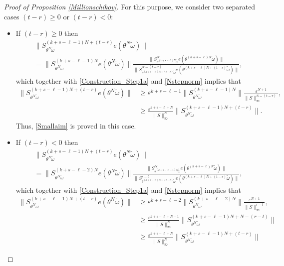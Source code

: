 \documentclass[pdflatex,sn-mathphys-num]{sn-jnl}%
\theoremstyle{thmstyleone}%
\theoremstyle{thmstyletwo}%
\theoremstyle{thmstylethree}%
\newcommand{\eps}{\varepsilon}
\numberwithin{equation}{section}
\begin{document}
\begin{proof}[Proof of Proposition \ref{Millionschikov}]
For this purpose, we consider two separated cases $(t-r)\geq 0$ or $(t-r)<0$:
\begin{itemize}
    \item If $(t-r)\geq 0$ then
    \begin{align*}
       &\|S_{\theta^N\widetilde\omega}^{(k+s-\ell-1)N+(t-r)}e(\theta^N\widetilde\omega)\|\\[1ex]
       &= \|S_{\theta^N\widetilde\omega}^{(k+s-\ell-1)N}e(\theta^N\widetilde\omega)\|
       \frac{\|S^{N}_{\theta^{(k+s-\ell)N}\widetilde\omega}e(\theta^{(k+s-\ell)N}\widetilde\omega)\|}{\|S^{N-(t-r)}_{\theta^{(k+s-\ell)N+(t-r)}\widetilde\omega}e(\theta^{(k+s-\ell)N+(t-r)}\widetilde\omega)\|},
    \end{align*}
which together with \eqref{Construction_Step1a} and \eqref{Nstepnorm} implies that  \begin{align*}
       \|S_{\theta^N\widetilde\omega}^{(k+s-\ell-1)N+(t-r)}e(\theta^N\widetilde\omega)\|
       &\geq \eps^{k+s-\ell-1}\|S_{\theta^N\widetilde\omega}^{(k+s-\ell-1)N}\|\frac{\eps^{N+1}}{\|S\|_{\infty}^{N-(t-r)}},\\[1ex]
       &\geq 
       \frac{\eps^{k+s-\ell+N}}{\|S\|_{\infty}^N}       \|S_{\theta^N\widetilde\omega}^{(k+s-\ell-1)N+(t-r)}\|.
    \end{align*}
Thus, \eqref{Smallaim} is proved in this case.
\item If $(t-r)<0$ then 
 \begin{align*}
       &\|S_{\theta^N\widetilde\omega}^{(k+s-\ell-1)N+(t-r)}e(\theta^N\widetilde\omega)\|\\[1ex]
       &= \|S_{\theta^N\widetilde\omega}^{(k+s-\ell-2)N}e(\theta^N\widetilde\omega)\|
       \frac{\|S^{N}_{\theta^{(k+s-\ell-1)N}\widetilde\omega}e(\theta^{(k+s-\ell)N}\widetilde\omega)\|}{\|S^{r-t}_{\theta^{(k+s-\ell)N+(t-r)}\widetilde\omega}e(\theta^{(k+s-\ell)N+(t-r)}\widetilde\omega)\|},
    \end{align*}
which together with \eqref{Construction_Step1a} and \eqref{Nstepnorm} implies that  \begin{align*}
       \|S_{\theta^N\widetilde\omega}^{(k+s-\ell-1)N+(t-r)}e(\theta^N\widetilde\omega)\|
       &\geq \eps^{k+s-\ell-2}\|S_{\theta^N\widetilde\omega}^{(k+s-\ell-2)N}\|\frac{\eps^{N+1}}{\|S\|_{\infty}^{r-t}},\\[1ex]
       &\geq 
       \frac{\eps^{k+s-\ell+N-1}}{\|S\|_{\infty}^N}       \|S_{\theta^N\widetilde\omega}^{(k+s-\ell-1)N+N-(r-t)}\|\\
       &\geq \frac{\eps^{k+s-\ell+N}}{\|S\|_{\infty}^N}       \|S_{\theta^N\widetilde\omega}^{(k+s-\ell-1)N+(t-r)}\|

\end{align*}
\end{itemize}
\end{proof}
\end{document}
